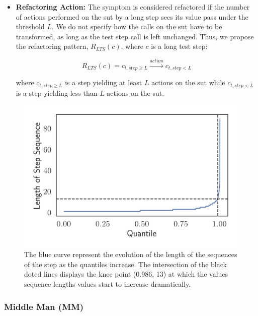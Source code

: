 \begin{itemize}
    \item \textbf{Refactoring Action:} The symptom is considered refactored if the number of actions performed on the \gls{sut} by a long step sees its value pass under the threshold $L$. We do not specify how the calls on the \gls{sut} have to be transformed, as long as the test step call is left unchanged. Thus, we propose the refactoring pattern, $R_{LTS}(c)$, where $c$ is a long test step:

    \begin{equation*}
        R_{LTS}(c) = c_{t, step\geq L} \xrightarrow{action} c_{t, step < L}
    \end{equation*}
    
    where $c_{t, step\geq L}$ is a step yielding at least $L$ actions on the \gls{sut} while $c_{t, step < L}$ is a step yielding less than $L$ actions on the \gls{sut}.

\end{itemize}

\begin{figure}
\centering
\includegraphics[width=0.6\linewidth]{figures/smells/step-sequences-quantiles.png}
\caption{The blue curve represent the evolution of the length of the sequences of the step as the quantiles increase. The intersection of the black doted lines displays the knee point (0.986, 13) at which the values sequence lengths values start to increase dramatically.}  
\label{fig:step-sequences-quantiles}
\end{figure}


\subsubsection{Middle Man (MM)}

